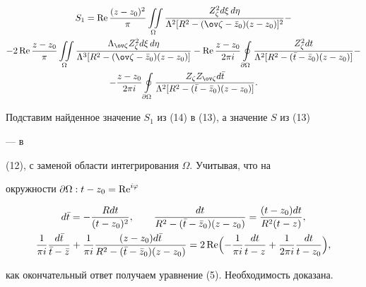 \begin{multline} 


S_1=\re\frac{(z-z_0)^2}{\pi}\iintl_\Omega 


\frac{Z^2_{\zeta}d\xi\,d\eta} 


{\Lambda^2[R^2-(\ov\zeta-\Bar z_0)(z-z_0)]^2}-\\ 


% 


-2\re\frac{z-z_0}{\pi}\iintl_\Omega 


\frac{\Lambda_{\ov\zeta}Z^2_{\zeta}d\xi\,d\eta} 


{\Lambda^3[R^2-(\ov\zeta-\Bar z_0)(z-z_0)]}- 


\re\frac{z-z_0}{2\pi i}\ointl_{\partial\Omega} 


\frac{Z^2_{\zeta}dt} 


{\Lambda^2[R^2-(\Bar t-\Bar z_0)(z-z_0)]}-\\


-\frac{z-z_0}{2\pi i}\ointl_{\partial\Omega} 


\frac{Z_\zeta Z_{\ov\zeta}d\Bar t} 


{\Lambda^2[R^2-(\Bar t-\Bar z_0)(z-z_0)]}. 


\end{multline} 


Подставим найденное значение $S_1$ из (14) в (13), а значение $S$ из (13) 


--- в 


(12), с заменой области интегрирования $\Omega$. Учитывая, что на 


окружности $\partial\Omega:t-z_0=\operatorname{Re}^{i\varphi}$ 


\begin{gather*} 


d\Bar t=-\frac{Rdt}{(t-z_0)^2},\qquad 


\frac{dt}{R^2-(\Bar t-\Bar z_0)(z-z_0)}= 


\frac{(t-z_0)dt}{R^2(t-z)},\\ 


\frac{1}{\pi i}\frac{d\Bar t}{\Bar t-\Bar z}+\frac{1}{\pi i} 


\frac{(z-z_0)d\Bar t}{R^2-(\Bar t-\Bar z_0)(z-z_0)}= 


2\re\Bigl(-\frac{1}{\pi i}\frac{dt}{t-z}+\frac{1}{2\pi i} 


\frac{dt}{t-z_0}\Bigr), 


\end{gather*} 


как окончательный ответ получаем уравнение (5). Необходимость доказана. 


